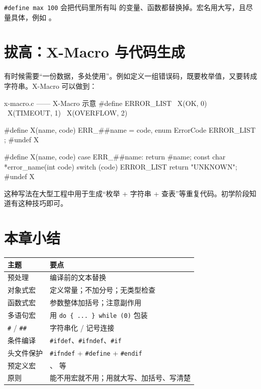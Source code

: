 \begin{pitfall}[宏名不要用短小的常见词]
\texttt{\#define max 100} 会把代码里所有叫  的变量、函数都替换掉。宏名用大写，且尽量具体，例如 。
\end{pitfall}

\section{拔高：X-Macro 与代码生成}

有时候需要“一份数据，多处使用”。例如定义一组错误码，既要枚举值，又要转成字符串。X-Macro 可以做到：

\begin{codebox}{x-macro.c —— X-Macro 示意}
#define ERROR_LIST \
    X(OK, 0)       \
    X(TIMEOUT, 1)  \
    X(OVERFLOW, 2)

#define X(name, code) ERR_##name = code,
enum ErrorCode {
    ERROR_LIST
};
#undef X

#define X(name, code) case ERR_##name: return #name;
const char *error_name(int code)
{
    switch (code) {
        ERROR_LIST
    }
    return "UNKNOWN";
}
#undef X
\end{codebox}

这种写法在大型工程中用于生成“枚举 + 字符串 + 查表”等重复代码。初学阶段知道有这种技巧即可。

\section{本章小结}

\begin{center}
\begin{tabular}{@{}p{}p{}@{}}
\toprule
主题 & 要点 \\
\midrule
预处理 & 编译前的文本替换 \\
对象式宏 & 定义常量；不加分号；无类型检查 \\
函数式宏 & 参数整体加括号；注意副作用 \\
多语句宏 & 用 \texttt{do \{ ... \} while (0)} 包装 \\
\texttt{\#} / \texttt{\#\#} & 字符串化 / 记号连接 \\
条件编译 & \texttt{\#ifdef}、\texttt{\#ifndef}、\texttt{\#if} \\
头文件保护 & \texttt{\#ifndef} + \texttt{\#define} + \texttt{\#endif} \\
预定义宏 & \code{__FILE__}、\code{__LINE__} 等 \\
原则 & 能不用宏就不用；用就大写、加括号、写清楚 \\
\bottomrule
\end{tabular}
\end{center}

